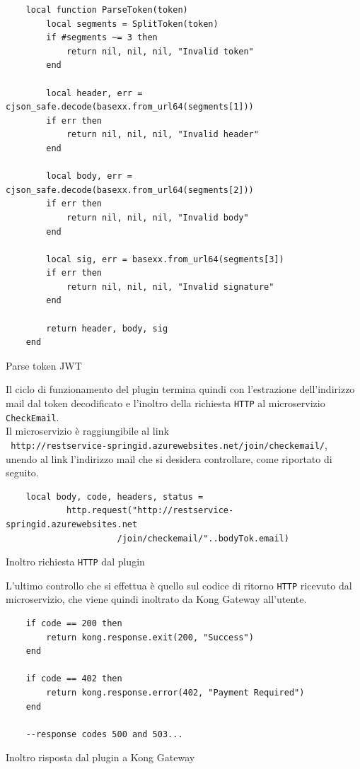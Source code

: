 \begin{algorithm}
\centering
\begin{verbatim}
	local function ParseToken(token)
		local segments = SplitToken(token)
		if #segments ~= 3 then
			return nil, nil, nil, "Invalid token"
		end

		local header, err = cjson_safe.decode(basexx.from_url64(segments[1]))
		if err then
			return nil, nil, nil, "Invalid header"
		end

		local body, err = cjson_safe.decode(basexx.from_url64(segments[2]))
		if err then
			return nil, nil, nil, "Invalid body"
		end

		local sig, err = basexx.from_url64(segments[3])
		if err then
			return nil, nil, nil, "Invalid signature"
		end

		return header, body, sig
	end
\end{verbatim}
\caption{Parse token JWT}\label{alg:parsetoken}
\end{algorithm}
\newpage
Il ciclo di funzionamento del plugin termina quindi con l'estrazione dell'indirizzo mail dal token decodificato e l'inoltro della richiesta \texttt{HTTP} al microservizio \texttt{CheckEmail}.\\
Il microservizio è raggiungibile al link\\ \texttt{ http://restservice-springid.azurewebsites.net/join/checkemail/}, \\
unendo al link l'indirizzo mail che si desidera controllare, come riportato di seguito.\\
\begin{algorithm}
\centering
\begin{verbatim}
    local body, code, headers, status = 
			http.request("http://restservice-springid.azurewebsites.net
				      /join/checkemail/"..bodyTok.email)
\end{verbatim}
\caption{Inoltro richiesta \texttt{HTTP} dal plugin}\label{alg:pluginhttprequest }
\end{algorithm}

L'ultimo controllo che si effettua è quello sul codice di ritorno \texttt{HTTP} ricevuto dal microservizio, che viene quindi inoltrato da Kong Gateway all'utente.

\begin{algorithm}
\centering
\begin{verbatim}
    if code == 200 then
        return kong.response.exit(200, "Success")
    end

    if code == 402 then
        return kong.response.error(402, "Payment Required")
    end

	--response codes 500 and 503...
\end{verbatim}
\caption{Inoltro risposta dal plugin a Kong Gateway}\label{alg:plugingatewayresponse}
\end{algorithm}


